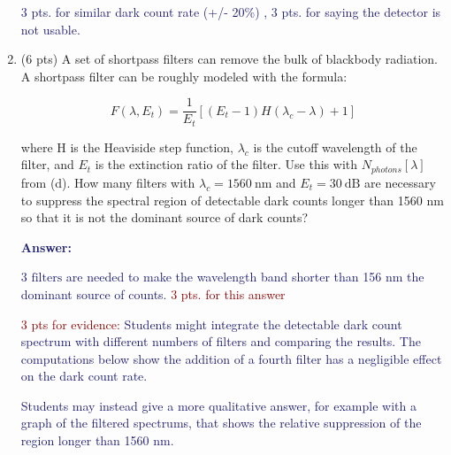 \documentclass[11pt]{caltech_thesis} %
\begin{document}
\begin{enumerate}
  \textcolor{midnightblue}{3 pts. for similar dark count rate (+/- 20\%) , 3 pts. for saying the detector is not usable.}
\item
  (6 pts) A set of shortpass filters can remove the bulk of blackbody radiation. A shortpass filter can be roughly modeled with the formula:

  $$F(\lambda, E_t) = \frac{1}{E_t}[(E_t - 1)H(\lambda_c - \lambda) + 1]$$

  where H is the Heaviside step function, $\lambda_c$ is the cutoff wavelength of the filter, and $E_t$ is the extinction ratio of the filter. Use this with $N_{photons}[\lambda]$ from (d). How many filters with $\lambda_c = 1560~\text{nm}$ and $E_t = 30~\text{dB}$ are necessary to suppress the spectral region of detectable dark counts longer than 1560 nm so that it is not the dominant source of dark counts?

  \textcolor{midnightblue}{ \textbf{Answer:} }

  \textcolor{midnightblue}{$\boxed{\text{3 filters}}$ are needed to make the wavelength band shorter than 156 nm the dominant source of counts.} \textcolor{darkred}{3 pts. for this answer}

  \textcolor{darkred}{3 pts for evidence:}
  \textcolor{midnightblue}{Students might integrate the detectable dark count spectrum with different numbers of filters and comparing the results. The computations below show the addition of a fourth filter has a negligible effect on the dark count rate. }

  \textcolor{midnightblue}{Students may instead give a more qualitative answer, for example with a graph of the filtered spectrums, that shows the relative suppression of the region longer than 1560 nm. }


\end{enumerate}
\end{document}
